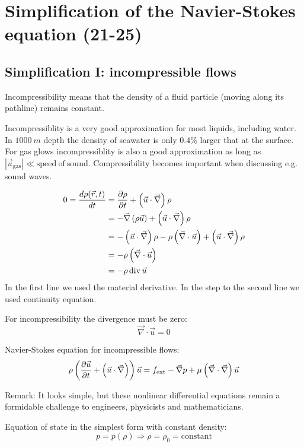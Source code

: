 \newpage
\section{Simplification of the Navier-Stokes equation (21-25)}

\subsection{Simplification I: incompressible flows}
Incompressibility means that the density of a fluid particle (moving along its pathline) remains constant.

Incompressiblity is a very good approximation for most liquids, including water. In $\SI{1000}{m}$ depth the density of seawater is only $0.4\%$ larger that at the surface. For gas glows incompressiblity is also a good approximation as long as $|\vec{u}_\mathrm{gas}| \ll \mathrm{speed\ of\ sound}$. Compressibility becomes important when discussing e.g. sound waves.

\begin{align}
0 = \frac{d \rho(\vec{r},t)}{d t} &= \frac{\partial \rho}{\partial t}+\left(\vec{u}\cdot\vec{\nabla}\right)\rho\\
&= -\vec{\nabla}\left(\rho\vec{u}\right)+\left(\vec{u}\cdot\vec{\nabla}\right)\rho \\
&= -\left(\vec{u}\cdot\vec{\nabla}\right)\rho - \rho\left(\vec{\nabla}\cdot\vec{u}\right) + \left(\vec{u}\cdot\vec{\nabla}\right)\rho\\
&= -\rho\left(\vec{\nabla}\cdot\vec{u}\right)\\
&= -\rho\, \mathrm{div}\, \vec{u}
\end{align}
In the first line we used the material derivative. In the step to the second line we used continuity equation.

For incompressibility the divergence must be zero:
\begin{equation}
\vec{\nabla}\cdot\vec{u} = 0
\end{equation}

Navier-Stokes equation for incompressible flows:
\begin{equation}
\rho\left(\frac{\partial \vec{u}}{\partial t}+\left(\vec{u}\cdot\vec{\nabla}\right)\right)\vec{u} = f_\mathrm{ext}-\vec{\nabla}p+\mu\left(\vec{\nabla}\cdot\vec{\nabla}\right)\vec{u}
\end{equation}
\begin{framed}
Remark: It looks simple, but these nonlinear differential equations remain a formidable challenge to engineers, physicists and mathematicians.
\end{framed}
Equation of state in the simplest form with constant density:
\begin{equation}
p=p(\rho) \Rightarrow \rho=\rho_0=\mathrm{constant}
\end{equation}


